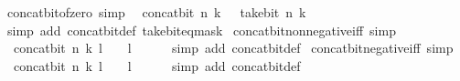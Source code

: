 \begin{isabellebody}
\endisatagproof
{\isafoldproof}%
%
\isadelimproof
\isanewline
%
\endisadelimproof
\isanewline
{}\isamarkupfalse%
\ concat{\isacharunderscore}{\kern0pt}bit{\isacharunderscore}{\kern0pt}of{\isacharunderscore}{\kern0pt}zero{\isacharunderscore}{\kern0pt}{}\ {\isacharbrackleft}{\kern0pt}simp{\isacharbrackright}{\kern0pt}{\isacharcolon}{\kern0pt}\isanewline
\ \ {\isacartoucheopen}concat{\isacharunderscore}{\kern0pt}bit\ n\ k\ {}\ {\isacharequal}{\kern0pt}\ take{\isacharunderscore}{\kern0pt}bit\ n\ k{\isacartoucheclose}\isanewline
%
\isadelimproof
\ \ %
\endisadelimproof
%
\isatagproof
{}\isamarkupfalse%
\ {\isacharparenleft}{\kern0pt}simp\ add{\isacharcolon}{\kern0pt}\ concat{\isacharunderscore}{\kern0pt}bit{\isacharunderscore}{\kern0pt}def\ take{\isacharunderscore}{\kern0pt}bit{\isacharunderscore}{\kern0pt}eq{\isacharunderscore}{\kern0pt}mask{\isacharparenright}{\kern0pt}%
\endisatagproof
{\isafoldproof}%
%
\isadelimproof
\isanewline
%
\endisadelimproof
\isanewline
{}\isamarkupfalse%
\ concat{\isacharunderscore}{\kern0pt}bit{\isacharunderscore}{\kern0pt}nonnegative{\isacharunderscore}{\kern0pt}iff\ {\isacharbrackleft}{\kern0pt}simp{\isacharbrackright}{\kern0pt}{\isacharcolon}{\kern0pt}\isanewline
\ \ {\isacartoucheopen}concat{\isacharunderscore}{\kern0pt}bit\ n\ k\ l\ {\isasymge}\ {}\ {\isasymlongleftrightarrow}\ l\ {\isasymge}\ {}{\isacartoucheclose}\isanewline
%
\isadelimproof
\ \ %
\endisadelimproof
%
\isatagproof
{}\isamarkupfalse%
\ {\isacharparenleft}{\kern0pt}simp\ add{\isacharcolon}{\kern0pt}\ concat{\isacharunderscore}{\kern0pt}bit{\isacharunderscore}{\kern0pt}def{\isacharparenright}{\kern0pt}%
\endisatagproof
{\isafoldproof}%
%
\isadelimproof
\isanewline
%
\endisadelimproof
\isanewline
{}\isamarkupfalse%
\ concat{\isacharunderscore}{\kern0pt}bit{\isacharunderscore}{\kern0pt}negative{\isacharunderscore}{\kern0pt}iff\ {\isacharbrackleft}{\kern0pt}simp{\isacharbrackright}{\kern0pt}{\isacharcolon}{\kern0pt}\isanewline
\ \ {\isacartoucheopen}concat{\isacharunderscore}{\kern0pt}bit\ n\ k\ l\ {\isacharless}{\kern0pt}\ {}\ {\isasymlongleftrightarrow}\ l\ {\isacharless}{\kern0pt}\ {}{\isacartoucheclose}\isanewline
%
\isadelimproof
\ \ %
\endisadelimproof
%
\isatagproof
{}\isamarkupfalse%
\ {\isacharparenleft}{\kern0pt}simp\ add{\isacharcolon}{\kern0pt}\ concat{\isacharunderscore}{\kern0pt}bit{\isacharunderscore}{\kern0pt}def{\isacharparenright}{\kern0pt}%
\endisatagproof
{\isafoldproof}%
%
\isadelimproof

\end{isabellebody}
